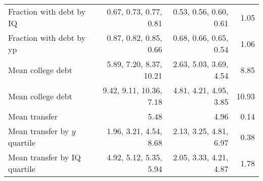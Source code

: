 \begin{tabular}{lrrr}
Fraction with debt by IQ & 0.67, 0.73, 0.77, 0.81  & 0.53, 0.56, 0.60, 0.61  & 1.05  \\ 
Fraction with debt by yp & 0.87, 0.82, 0.85, 0.66  & 0.68, 0.66, 0.65, 0.54  & 1.06  \\ 
Mean college debt & 5.89, 7.20, 8.37, 10.21  & 2.63, 5.03, 3.69, 4.54  & 8.85  \\ 
Mean college debt & 9.42, 9.11, 10.36, 7.18  & 4.81, 4.21, 4.95, 3.85  & 10.93  \\ 
Mean transfer & 5.48  & 4.96  & 0.14  \\ 
Mean transfer by $y$ quartile & 1.96, 3.21, 4.54, 8.68  & 2.13, 3.25, 4.81, 6.97  & 0.38  \\ 
Mean transfer by IQ quartile & 4.92, 5.12, 5.35, 5.94  & 2.05, 3.33, 4.21, 4.87  & 1.78  \\ 
\hline
\end{tabular}%
